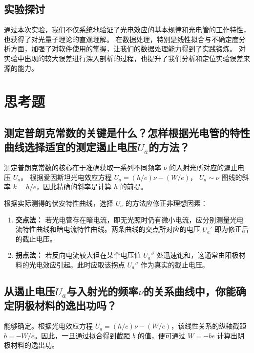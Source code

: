 \documentclass{../template/Report}%
\begin{document}
\begin{fullreportonly}
\subsection{实验探讨}
通过本次实验，我们不仅系统地验证了光电效应的基本规律和光电管的工作特性，也获得了对光量子理论的直观理解。
在数据处理，特别是线性拟合与不确定度分析方面，加强了对软件使用的掌握，让我们的数据处理能力得到了实践锻炼。
对实验中出现的较大误差进行深入剖析的过程，也提升了我们分析和定位实验误差来源的能力。

\section{思考题}
\subsection{测定普朗克常数的关键是什么？怎样根据光电管的特性曲线选择适宜的测定遏止电压$U_a$的方法？}

测定普朗克常数的核心在于准确获取一系列不同频率 $\nu$ 的入射光所对应的遏止电压 $U_a$。
根据爱因斯坦光电效应方程 $U_a = (h/e)\nu - (W/e)$， $U_a \sim \nu$ 图线的斜率 $k = h/e$，因此精确的斜率是计算 $h$ 的前提。

根据实际测得的伏安特性曲线，选择 $U_a$ 的方法应修正非理想因素：
\begin{enumerate}
    \item \textbf{交点法：} 若光电管存在暗电流，即无光照时仍有微小电流，应分别测量光电流特性曲线和暗电流特性曲线。两条曲线的交点所对应的电压 $U_a'$ 即为修正后的截止电压。
    \item \textbf{拐点法：} 若反向电流较大但在某个电压值 $U_a''$ 处迅速饱和，这通常由阳极材料的光电效应引起。此时应取该拐点 $U_a''$ 作为真实的截止电压。
\end{enumerate}

\subsection{从遏止电压$U_a$与入射光的频率$\nu$的关系曲线中，你能确定阴极材料的逸出功吗？}
能够确定。根据光电效应方程 $U_a = (h/e)\nu - (W/e)$，该线性关系的纵轴截距$b = -W/e$。因此，一旦通过拟合得到截距 $b$ 的值，便可通过 $W = -be$ 计算出阴极材料的逸出功。


\end{fullreportonly}
\end{document}

